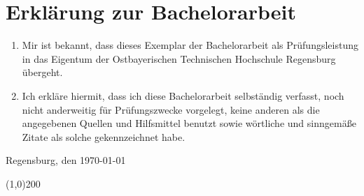 \thispagestyle{empty}
\section*{Erklärung zur Bachelorarbeit}

\bigskip
\bigskip 
\bigskip 

\begin{enumerate}
    \item Mir ist bekannt, dass dieses Exemplar der Bachelorarbeit als Prüfungsleistung in das Eigentum der Ostbayerischen Technischen Hochschule Regensburg übergeht.
    \item Ich erkläre hiermit, dass ich diese Bachelorarbeit selbständig verfasst, noch nicht anderweitig für Prüfungszwecke vorgelegt, keine anderen als die angegebenen Quellen und Hilfsmittel benutzt sowie wörtliche und sinngemäße Zitate als solche gekennzeichnet habe.
\end{enumerate}

\bigskip 
\bigskip 
\bigskip 

Regensburg, den \today

\bigskip 
\bigskip

\line(1,0){200}
\newline
\studierenderName